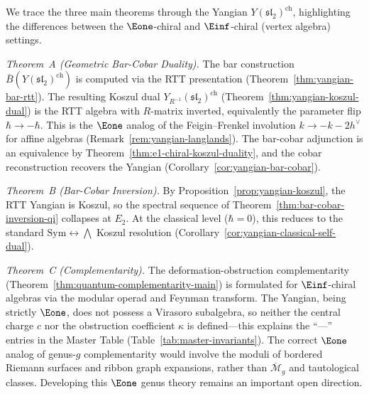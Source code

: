 \begin{remark}
\label{rem:yangian-three-theorems}
We trace the three main theorems through the Yangian
$Y(\mathfrak{sl}_2)^{\mathrm{ch}}$, highlighting the differences
between the $\Eone$-chiral and $\Einf$-chiral (vertex algebra) settings.

\emph{Theorem~A (Geometric Bar-Cobar Duality).}
The bar construction $\bar{B}(Y(\mathfrak{sl}_2)^{\mathrm{ch}})$
is computed via the RTT presentation
(Theorem~\ref{thm:yangian-bar-rtt}).  The resulting Koszul dual
$Y_{R^{-1}}(\mathfrak{sl}_2)^{\mathrm{ch}}$
(Theorem~\ref{thm:yangian-koszul-dual}) is the RTT algebra with
$R$-matrix inverted, equivalently the parameter flip
$\hbar \to -\hbar$.  This is the $\Eone$ analog of the
Feigin--Frenkel involution $k \to -k - 2h^\vee$ for affine algebras
(Remark~\ref{rem:yangian-langlands}).  The bar-cobar adjunction is an
equivalence by Theorem~\ref{thm:e1-chiral-koszul-duality}, and the
cobar reconstruction recovers the Yangian
(Corollary~\ref{cor:yangian-bar-cobar}).

\emph{Theorem~B (Bar-Cobar Inversion).}
By Proposition~\ref{prop:yangian-koszul}, the RTT Yangian is Koszul,
so the spectral sequence of
Theorem~\ref{thm:bar-cobar-inversion-qi} collapses at $E_2$.
At the classical level ($\hbar = 0$), this reduces to the standard
$\mathrm{Sym} \leftrightarrow \bigwedge$ Koszul resolution
(Corollary~\ref{cor:yangian-classical-self-dual}).

\emph{Theorem~C (Complementarity).}
The deformation-obstruction complementarity
(Theorem~\ref{thm:quantum-complementarity-main}) is formulated for
$\Einf$-chiral algebras via the modular operad and Feynman transform.
The Yangian, being strictly $\Eone$, does not possess a Virasoro
subalgebra, so neither the central charge $c$ nor the obstruction
coefficient $\kappa$ is defined---this explains the ``---'' entries
in the Master Table (Table~\ref{tab:master-invariants}).  The correct
$\Eone$ analog of genus-$g$ complementarity would involve the moduli
of bordered Riemann surfaces and ribbon graph expansions, rather than
$\overline{\mathcal{M}}_g$ and tautological classes.  Developing this
$\Eone$ genus theory remains an important open direction.
\end{remark}



